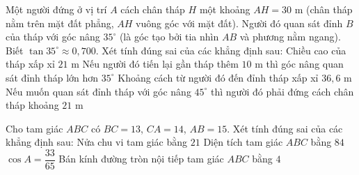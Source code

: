 \begin{ex}%
Một người đứng ở vị trí $A$ cách chân tháp $H$ một khoảng $AH=30$ m (chân tháp nằm trên mặt đất phẳng, $AH$ vuông góc với mặt đất). Người đó quan sát đỉnh $B$ của tháp với góc nâng $35^\circ$ (là góc tạo bởi tia nhìn $AB$ và phương nằm ngang). Biết $\tan 35^\circ\approx 0{,}700$. Xét tính đúng sai của các khẳng định sau:
\choiceTF
{\True Chiều cao của tháp xấp xỉ $21$ m}
{\True Nếu người đó tiến lại gần tháp thêm $10$ m thì góc nâng quan sát đỉnh tháp lớn hơn $35^\circ$}
{\True Khoảng cách từ người đó đến đỉnh tháp xấp xỉ $36{,}6$ m}
{\True Nếu muốn quan sát đỉnh tháp với góc nâng $45^\circ$ thì người đó phải đứng cách chân tháp khoảng $21$ m}
\end{ex}

\begin{ex}%
Cho tam giác $ABC$ có $BC=13$, $CA=14$, $AB=15$. Xét tính đúng sai của các khẳng định sau:
\choiceTF
{\True Nửa chu vi tam giác bằng $21$}
{\True Diện tích tam giác $ABC$ bằng $84$}
{\True $\cos A=\dfrac{33}{65}$}
{\True Bán kính đường tròn nội tiếp tam giác $ABC$ bằng $4$}
\end{ex}

